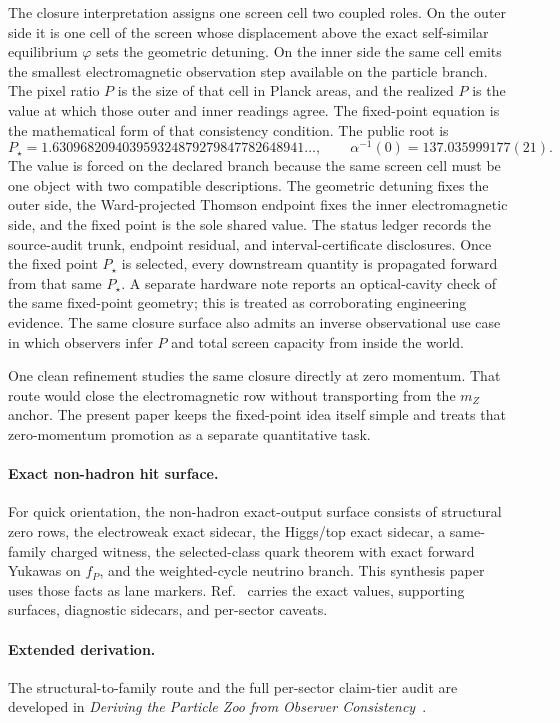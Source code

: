 The closure interpretation assigns one screen cell two coupled roles. On the outer side it is one
cell of the screen whose displacement above the exact self-similar equilibrium \(\varphi\) sets
the geometric detuning. On the inner side the same cell emits the smallest electromagnetic
observation step available on the particle branch. The pixel ratio \(P\) is the size of that cell
in Planck areas, and the realized \(P\) is the value at which those outer and inner readings
agree. The fixed-point equation is the mathematical form of that consistency condition. The public
root is
\[
P_\star=1.630968209403959324879279847782648941\ldots,\qquad
\alpha^{-1}(0)=137.035999177(21).
\]
The value is forced on the declared branch because the same screen cell must be
one object with two compatible descriptions. The geometric detuning fixes the
outer side, the Ward-projected Thomson endpoint fixes the inner electromagnetic
side, and the fixed point is the sole shared value.
The status ledger records the source-audit trunk, endpoint residual, and interval-certificate
disclosures. Once the fixed point \(P_\star\) is selected, every downstream
quantity is propagated forward from that same \(P_\star\).
A separate hardware note reports an optical-cavity check of the same fixed-point geometry;
this is treated as corroborating engineering evidence.
The same closure surface also admits an inverse observational use case in which observers infer
\(P\) and total screen capacity from inside the world.

One clean refinement studies the same closure directly at zero momentum. That route would close the
electromagnetic row without transporting from the \(m_Z\) anchor. The present paper keeps the
fixed-point idea itself simple and treats that zero-momentum promotion as a separate quantitative
task.

\paragraph{Exact non-hadron hit surface.}
For quick orientation, the non-hadron exact-output surface consists of structural zero rows,
the electroweak exact sidecar, the Higgs/top exact sidecar, a same-family charged witness, the
selected-class quark theorem with exact forward Yukawas on \(f_P\), and the weighted-cycle
neutrino branch. This synthesis paper uses those facts as lane markers. Ref.~\cite{ophparticles}
carries the exact values, supporting surfaces, diagnostic sidecars, and per-sector caveats.

\paragraph{Extended derivation.}
The structural-to-family route and the full per-sector claim-tier audit are developed in
\emph{Deriving the Particle Zoo from Observer Consistency}~\cite{ophparticles}.


